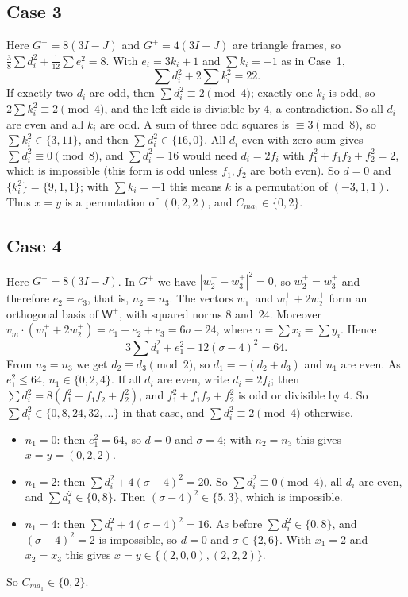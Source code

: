 \documentclass[11pt,a4paper]{amsart}
\theoremstyle{definition}
\theoremstyle{remark}
\newcommand{\Wp}{\mathsf{W}^{+}}
\begin{document}
\subsection*{Case 3}
Here $G^-=8(3I-J)$ and $G^+=4(3I-J)$ are triangle frames, so $\frac38\sum d_i^2+\frac1{12}\sum e_i^2=8$. With
$e_i=3k_i+1$ and $\sum k_i=-1$ as in Case~1,
\[
\textstyle\sum d_i^2+2\sum k_i^2=22 .
\]
If exactly two $d_i$ are odd, then $\sum d_i^2\equiv2\pmod 4$; exactly one $k_i$ is odd, so
$2\sum k_i^2\equiv2\pmod4$, and the left side is divisible by $4$, a contradiction. So all $d_i$ are even and all
$k_i$ are odd. A sum of three odd squares is $\equiv3\pmod 8$, so $\sum k_i^2\in\{3,11\}$, and then
$\sum d_i^2\in\{16,0\}$. All $d_i$ even with zero sum gives $\sum d_i^2\equiv0\pmod 8$, and $\sum d_i^2=16$ would
need $d_i=2f_i$ with $f_1^2+f_1f_2+f_2^2=2$, which is impossible (this form is odd unless $f_1,f_2$ are both even). So
$d=0$ and $\{k_i^2\}=\{9,1,1\}$; with $\sum k_i=-1$ this means $k$ is a permutation of $(-3,1,1)$. Thus
$x=y$ is a permutation of $(0,2,2)$, and $C_{ma_1}\in\{0,2\}$.

\subsection*{Case 4}
Here $G^-=8(3I-J)$. In $G^+$ we have $|w_2^+-w_3^+|^2=0$, so $w_2^+=w_3^+$ and therefore $e_2=e_3$, that is,
$n_2=n_3$. The vectors $w_1^+$ and $w_1^++2w_2^+$ form an orthogonal basis of $\Wp$, with squared norms $8$
and~$24$. Moreover $v_m\cdot(w_1^++2w_2^+)=e_1+e_2+e_3=6\sigma-24$, where $\sigma=\sum x_i=\sum y_i$. Hence
\[
3\textstyle\sum d_i^2+e_1^2+12(\sigma-4)^2=64 .
\]
From $n_2=n_3$ we get $d_2\equiv d_3\pmod2$, so $d_1=-(d_2+d_3)$ and $n_1$ are even. As $e_1^2\le64$,
$n_1\in\{0,2,4\}$. If all $d_i$ are even, write $d_i=2f_i$; then $\sum d_i^2=8(f_1^2+f_1f_2+f_2^2)$, and
$f_1^2+f_1f_2+f_2^2$ is odd or divisible by $4$. So $\sum d_i^2\in\{0,8,24,32,\dots\}$ in that case, and
$\sum d_i^2\equiv2\pmod4$ otherwise.
\begin{itemize}[leftmargin=2em]
\item $n_1=0$: then $e_1^2=64$, so $d=0$ and $\sigma=4$; with $n_2=n_3$ this gives $x=y=(0,2,2)$.
\item $n_1=2$: then $\sum d_i^2+4(\sigma-4)^2=20$. So $\sum d_i^2\equiv0\pmod 4$, all $d_i$ are even, and
$\sum d_i^2\in\{0,8\}$. Then $(\sigma-4)^2\in\{5,3\}$, which is impossible.
\item $n_1=4$: then $\sum d_i^2+4(\sigma-4)^2=16$. As before $\sum d_i^2\in\{0,8\}$, and $(\sigma-4)^2=2$ is
impossible, so $d=0$ and $\sigma\in\{2,6\}$. With $x_1=2$ and $x_2=x_3$ this gives $x=y\in\{(2,0,0),(2,2,2)\}$.
\end{itemize}
So $C_{ma_1}\in\{0,2\}$.
\end{document}
